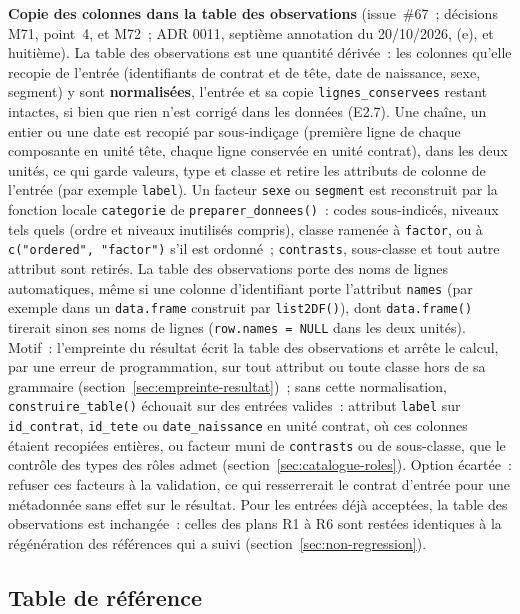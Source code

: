 \documentclass[a4paper,11pt]{article}
\newcommand{\code}[1]{\texttt{\small #1}}
\begin{document}
\medskip
\textbf{Copie des colonnes dans la table des observations} (issue~\#67~;
décisions M71, point~4, et M72~; ADR 0011, septième annotation du
20/10/2026, (e), et huitième). La table des observations est une quantité
dérivée~: les colonnes qu'elle recopie de l'entrée (identifiants de contrat
et de tête, date de naissance, sexe, segment) y sont \textbf{normalisées},
l'entrée et sa copie \code{lignes\_conservees} restant intactes, si bien que
rien n'est corrigé dans les données (E2.7). Une chaîne, un entier ou une date
est recopié par sous-indiçage (première ligne de chaque composante en unité
tête, chaque ligne conservée en unité contrat), dans les deux unités, ce qui
garde valeurs, type et classe et retire les attributs de colonne de
l'entrée (par exemple \code{label}). Un facteur \code{sexe} ou
\code{segment} est reconstruit par la fonction locale \code{categorie} de
\code{preparer\_donnees()}~: codes sous-indicés, niveaux tels quels (ordre et
niveaux inutilisés compris), classe ramenée à \code{factor}, ou à
\code{c("ordered", "factor")} s'il est ordonné~; \code{contrasts}, sous-classe
et tout autre attribut sont retirés. La table des observations porte des
noms de lignes automatiques, même si une colonne d'identifiant porte
l'attribut \code{names} (par exemple dans un \code{data.frame} construit par
\code{list2DF()}), dont \code{data.frame()} tirerait sinon ses noms de
lignes (\code{row.names = NULL} dans les deux unités). Motif~: l'empreinte du résultat écrit la
table des observations et arrête le calcul, par une erreur de programmation,
sur tout attribut ou toute classe hors de sa grammaire
(section~\ref{sec:empreinte-resultat})~; sans cette normalisation,
\code{construire\_table()} échouait sur des entrées valides~: attribut
\code{label} sur \code{id\_contrat}, \code{id\_tete} ou
\code{date\_naissance} en unité contrat, où ces colonnes étaient recopiées
entières, ou facteur muni de \code{contrasts} ou de sous-classe, que le
contrôle des types des rôles admet (section~\ref{sec:catalogue-roles}).
Option écartée~: refuser ces facteurs à la validation, ce qui resserrerait
le contrat d'entrée pour une métadonnée sans effet sur le résultat. Pour les
entrées déjà acceptées, la table des observations est inchangée~: celles des
plans R1 à R6 sont restées identiques à la régénération des références qui a
suivi (section~\ref{sec:non-regression}).

\subsection{Table de référence}
\label{sec:table-reference}
\end{document}
